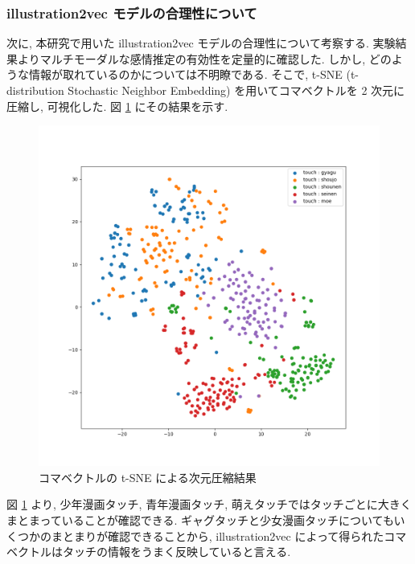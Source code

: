 \newpage
\changeindent{0cm}
\subsubsection{illustration2vec モデルの合理性について}
\changeindent{2cm}

次に, 本研究で用いた illustration2vec モデルの合理性について考察する. 実験結果よりマルチモーダルな感情推定の有効性を定量的に確認した. しかし, どのような情報が取れているのかについては不明瞭である. そこで, t-SNE (t-distribution Stochastic Neighbor Embedding) \cite{vanDerMaaten2008} を用いてコマベクトルを 2 次元に圧縮し, 可視化した. 図 \ref{fig:koma_tsne} にその結果を示す.

\begin{figure}[!h]
  \vspace{5mm}
  \centering
  \includegraphics[width=0.9\hsize]{doc/figures/koma_tsne.png}
  \caption{コマベクトルの t-SNE による次元圧縮結果}
  \label{fig:koma_tsne}
\end{figure}

\newpage
図 \ref{fig:koma_tsne} より, 少年漫画タッチ, 青年漫画タッチ, 萌えタッチではタッチごとに大きくまとまっていることが確認できる. ギャグタッチと少女漫画タッチについてもいくつかのまとまりが確認できることから, illustration2vec によって得られたコマベクトルはタッチの情報をうまく反映していると言える.

